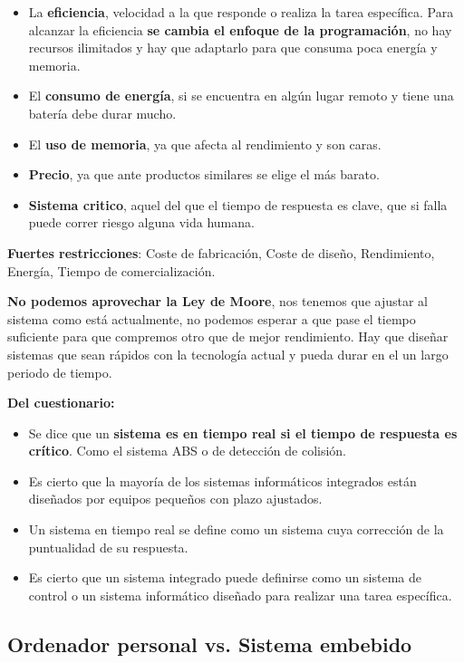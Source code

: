 \documentclass[12pt]{report} %
\begin{document}
\begin{itemize}

\item
  La \textbf{eficiencia}, velocidad a la que responde o realiza la tarea
  específica. Para alcanzar la eficiencia \textbf{se cambia el enfoque
  de la programación}, no hay recursos ilimitados y hay que adaptarlo
  para que consuma poca energía y memoria.
\item
  El \textbf{consumo de energía}, si se encuentra en algún lugar remoto
  y tiene una batería debe durar mucho.
\item
  El \textbf{uso de memoria}, ya que afecta al rendimiento y son caras.
\item
  \textbf{Precio}, ya que ante productos similares se elige el más
  barato.
\item
  \textbf{Sistema critico}, aquel del que el tiempo de respuesta es
  clave, que si falla puede correr riesgo alguna vida humana.
\end{itemize}

\textbf{Fuertes restricciones}: Coste de fabricación, Coste de diseño, Rendimiento, Energía, Tiempo de comercialización.

\textbf{No podemos aprovechar la Ley de Moore}, nos tenemos que ajustar
al sistema como está actualmente, no podemos esperar a que pase el
tiempo suficiente para que compremos otro que de mejor rendimiento. Hay
que diseñar sistemas que sean rápidos con la tecnología actual y pueda
durar en el un largo periodo de tiempo.

\textbf{Del cuestionario:}

\begin{itemize}

\item
  Se dice que un \textbf{sistema es en tiempo real si el tiempo de
  respuesta es crítico}. Como el sistema ABS o de detección de colisión.
\item
  Es cierto que la mayoría de los sistemas informáticos integrados están
  diseñados por equipos pequeños con plazo ajustados.
\item
  Un sistema en tiempo real se define como un sistema cuya corrección de
  la puntualidad de su respuesta.
\item
  Es cierto que un sistema integrado puede definirse como un sistema de
  control o un sistema informático diseñado para realizar una tarea
  específica.
\end{itemize}

\subsection{Ordenador personal vs. Sistema
embebido}
\end{document}

